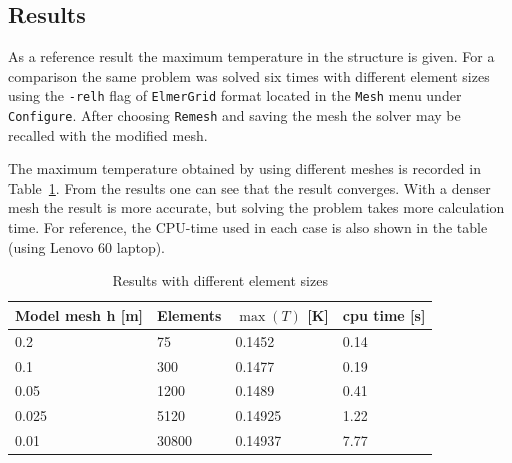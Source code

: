 \subsection*{Results}

As a reference result the maximum temperature in the structure is given. For a
comparison the same problem was solved six times with different
element sizes using the \texttt{-relh} flag of \texttt{ElmerGrid} format located in the
\texttt{Mesh} menu under \texttt{Configure}. After choosing \texttt{Remesh} and saving the mesh 
the solver may be recalled with the modified mesh.

The maximum temperature obtained by using different
meshes is recorded in Table~\ref{tb:res1}.  From the results one
can see that the result converges. With a denser mesh the result is
more accurate, but solving the problem takes more calculation time.
For reference, the CPU-time used in each case is
also shown in the table (using Lenovo 60 laptop).

\begin{table}[h]
\caption{Results with different element sizes}
\label{tb:res1}
\begin{center}
\begin{tabular}{llll} \hline
Model mesh h [m] & Elements & $\max (T)$ [K] & cpu time [s]\\ \hline
0.2 & 75 &  0.1452  & 0.14 \\
0.1 &  300 & 0.1477  & 0.19 \\
0.05 & 1200 & 0.1489  & 0.41 \\ 
0.025 & 5120 & 0.14925 & 1.22 \\ 
0.01  & 30800 & 0.14937 & 7.77 \\ \hline
\end{tabular}
\end{center}
\end{table}

\hfill




